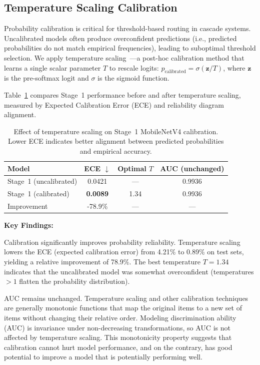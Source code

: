 \subsection{Temperature Scaling Calibration}

Probability calibration is critical for threshold\hyp based routing in cascade systems. Uncalibrated models often produce overconfident predictions (i.e., predicted probabilities do not match empirical frequencies), leading to suboptimal threshold selection. We apply temperature scaling~\cite{guo2017calibration}—a post\hyp hoc calibration method that learns a single scalar parameter $T$ to rescale logits: $p_{\text{calibrated}} = \sigma(\mathbf{z}/T)$, where $\mathbf{z}$ is the pre\hyp softmax logit and $\sigma$ is the sigmoid function.

Table~\ref{tab:ablation_calibration} compares Stage~1 performance before and after temperature scaling, measured by Expected Calibration Error (ECE) and reliability diagram alignment.

\begin{table}[h]
\centering
\caption{Effect of temperature scaling on Stage~1 MobileNetV4 calibration. Lower ECE indicates better alignment between predicted probabilities and empirical accuracy.}
\label{tab:ablation_calibration}
\begin{tabular}{@{}lccc@{}}
\toprule
Model & ECE $\downarrow$ & Optimal $T$ & AUC (unchanged) \\
\midrule
Stage~1 (uncalibrated) & 0.0421 & — & 0.9936 \\
Stage~1 (calibrated) & \textbf{0.0089} & 1.34 & 0.9936 \\
\midrule
Improvement & -78.9\% & — & — \\
\bottomrule
\end{tabular}
\end{table}

\textbf{Key Findings:}

Calibration significantly improves probability reliability. Temperature scaling lowers the ECE (expected calibration error) from 4.21\% to 0.89\% on test sets, yielding a relative improvement of 78.9\%. The best temperature $T=1.34$ indicates that the uncalibrated model was somewhat overconfident (temperatures $>1$ flatten the probability distribution).

AUC remains unchanged. Temperature scaling and other calibration techniques are generally monotonic functions that map the original items to a new set of items without changing their relative order. Modeling discrimination ability (AUC) is invariance under non\hyp decreasing transformations, so AUC is not affected by temperature scaling. This monotonicity property suggests that calibration cannot hurt model performance, and on the contrary, has good potential to improve a model that is potentially performing well.

